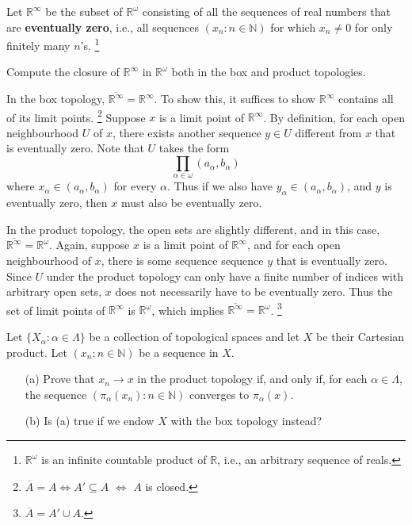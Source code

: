 \documentclass[../../main.tex]{subfiles}
\begin{document}
\begin{problem}[9]
    Let $\mathbb{R}^\infty$ be the subset of $\mathbb{R}^\omega$ consisting of all the sequences of real numbers that are \textbf{eventually zero}, i.e., all sequences $(x_n:n\in\mathbb{N})$ for which $x_n\neq 0$ for only finitely many $n$'s.
    \footnote{$\mathbb{R}^\omega$ is an infinite countable product of $\mathbb{R}$, i.e., an arbitrary sequence of reals.}

    Compute the closure of $\mathbb{R}^\infty$ in $\mathbb{R}^\omega$ both in the box and product topologies.
\end{problem}

In the box topology, $\overline{\mathbb{R}^\infty} = \mathbb{R}^\infty$.
To show this, it suffices to show $\mathbb{R}^\infty$ contains all of its limit points.
\footnote{$\overline{A} = A \Leftrightarrow A' \subseteq A$ $\Leftrightarrow$ $A$ is closed.}
Suppose $x$ is a limit point of $\mathbb{R}^\infty$.
By definition, for each open neighbourhood $U$ of $x$, there exists another sequence $y \in U$ different from $x$ that is eventually zero.
Note that $U$ takes the form
\[
    \prod_{\alpha \in \omega} (a_\alpha, b_\alpha)
\]
where $x_\alpha \in (a_\alpha, b_\alpha)$ for every $\alpha$.
Thus if we also have $y_\alpha \in (a_\alpha, b_\alpha)$, and $y$ is eventually zero, then $x$ must also be eventually zero.

In the product topology, the open sets are slightly different, and in this case, $\overline{\mathbb{R}^\infty} = \mathbb{R}^\omega$.
Again, suppose $x$ is a limit point of $\mathbb{R}^\infty$, and for each open neighbourhood of $x$, there is some sequence sequence $y$ that is eventually zero.
Since $U$ under the product topology can only have a finite number of indices with arbitrary open sets, $x$ does not necessarily have to be eventually zero.
Thus the set of limit points of $\mathbb{R}^\infty$ is $\mathbb{R}^\omega$, which implies $\overline{\mathbb{R}^\infty} = \mathbb{R}^\omega$.
\footnote{$\overline{A} = A' \cup A$.}

\begin{problem}[10]
Let $\{X_\alpha:\alpha\in\Lambda\}$ be a collection of topological spaces and let $X$ be their Cartesian product.
Let $(x_n:n\in\mathbb{N})$ be a sequence in $X$.
\begin{enumerate}
    \item[(a)] Prove that $x_n \to x$ in the product topology if, and only if, for each $\alpha\in\Lambda$, the sequence $(\pi_\alpha(x_n):n\in\mathbb{N})$ converges to $\pi_\alpha(x)$.
    \item[(b)] Is (a) true if we endow $X$ with the box topology instead?
\end{enumerate}
\end{problem}
\end{document}
